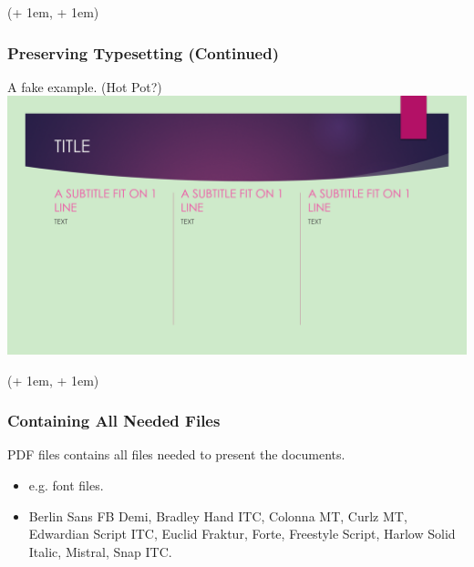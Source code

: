 \documentclass[xcolor=dvipsnames]{beamer}
\newcommand{\FrameTextCrono}[1]{
    \begin{textblock*}{\paperwidth}(\textwidth + 1em, \textheight + 1em)
        #1
    \end{textblock*}
}
\let\oldframe\frame
\let\oldendframe\endframe
\renewenvironment{frame}
    {\oldframe\FrameTextCrono{\small\color{blue}{\crono}}}
    {\oldendframe}
\begin{document}
    \begin{frame}
        \frametitle{Preserving Typesetting (Continued)}
        A fake example. (Hot Pot?)
        \centering
        \includegraphics[scale=0.2]{fake_ppt.png}
    \end{frame}

    \begin{frame}
        \frametitle{Containing All Needed Files}
        PDF files contains all files needed to present the documents.
        \begin{itemize}
            \item e.g. font files.
            \item {Berlin Sans FB Demi,}
            {Bradley Hand ITC,}
            {Colonna MT,}
            {Curlz MT,}
            {Edwardian Script ITC,}
            {Euclid Fraktur,}
            {Forte,}
            {Freestyle Script,}
            {Harlow Solid Italic,}
            {Mistral,}
            {Snap ITC.}
        \end{itemize}
    \end{frame}
\end{document}
